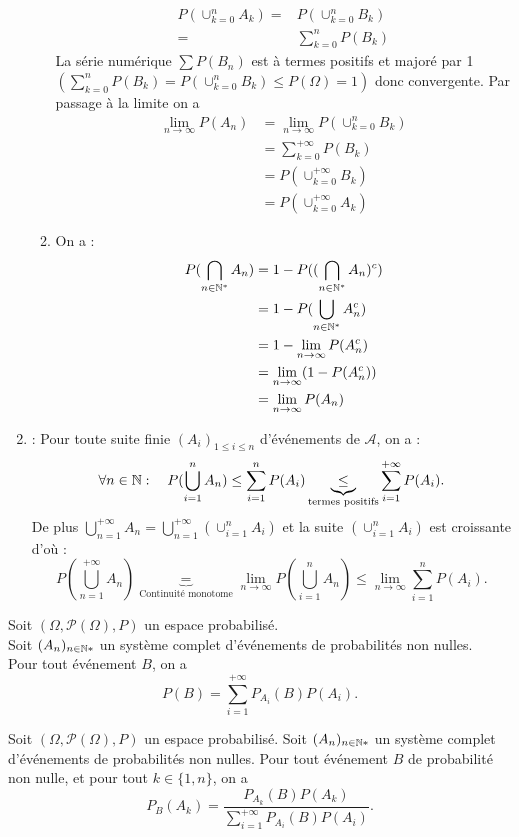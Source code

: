 \documentclass{book}
\begin{document}
\begin{Demonstration}
\begin{enumerate}
\begin{enumerate}
$$\begin{aligned}
P(\cup_{k=0}^n A_k)=&P(\cup_{k=0}^n B_k)\\
=& \sum_{k=0}^n P(B_k)
\end{aligned}$$
La série numérique $\sum  P(B_n)$ est à termes positifs et majoré par 1 $\left(\sum_{k=0}^n P(B_k)=P(\cup_{k=0}^n B_k)\leq P(\Omega)=1\right)$ donc convergente. Par passage à la limite on a 
$$\begin{aligned}
\lim\limits_{n\to \infty}P(A_n) &=\lim\limits_{n\to \infty} P(\cup_{k=0}^n B_k)\\
&=\sum_{k=0}^{+\infty} P(B_k)\\
&=P(\cup_{k=0}^{+\infty} B_k)\\
&=P(\cup_{k=0}^{+\infty} A_k)
\end{aligned}$$
\item On a :
$$\begin{aligned}
P(\bigcap_{n\in\mathbb{N}^*}A_n)&=1-P((\bigcap_{n\in\mathbb{N}^*}A_n)^c)\\
&=1-P(\bigcup_{n\in\mathbb{N}^*}A_n^c)\\
&=1-\lim\limits_{n\to \infty}P(A_n^c)\\
&=\lim\limits_{n\to \infty}(1-P(A_n^c))\\
&=\lim\limits_{n\to \infty}P(A_n)
\end{aligned}$$
\end{enumerate}
\item {} : Pour toute suite finie $(A_i)_{1\leq i \leq n}$ d'événements de $\mathcal{A}$, on a  :
$$\forall n \in \mathbb{N} :\quad P(\bigcup_{i=1}^n A_n)\leq \sum_{i=1}^{n} P(A_i)\underbrace{\leq}_{\text{termes positifs} } \sum_{i=1}^{+\infty} P(A_i).$$
De plus $\bigcup_{n=1}^{+\infty} A_n= \bigcup_{n=1}^{+\infty} (\cup_{i=1}^n A_i)$ et la suite $(\cup_{i=1}^n A_i)$ est croissante d'où :
$$P(\bigcup_{n=1}^{+\infty} A_n) \underbrace{=}_{\text{Continuité monotome}}\lim\limits_{n\to \infty}P(\bigcup_{i=1}^n A_n)\leq  \lim\limits_{n\to \infty} \sum_{i=1}^{n} P(A_i).$$ 
\end{enumerate}
\end{Demonstration}


\begin{Proposition}
Soit $(\Omega,\mathcal{P}(\Omega),P)$ un espace probabilisé.\\
Soit $ (A_n)_{n\in \mathbb{N}*}$ un système complet d'événements de probabilités non nulles.\\
Pour tout événement $B$, on a
\[ P(B) = \sum_{i=1}^{+\infty} P_{A_i}(B)P(A_i). \]
\end{Proposition}
\begin{Proposition}
Soit $(\Omega,\mathcal{P}(\Omega),P)$ un espace probabilisé.
Soit $(A_n)_{n\in \mathbb{N}*}$ un système complet d'événements de probabilités non nulles.
Pour tout événement $B$ de probabilité non nulle,
et pour tout $k\in\{1,n\}$, on a
\[ P_B(A_k) = \frac{ P_{A_k}(B)P(A_k) }{ \sum\limits_{i=1}^{+\infty} P_{A_i}(B)P(A_i) }. \]
\end{Proposition}
\end{document}
